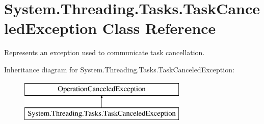 \hypertarget{class_system_1_1_threading_1_1_tasks_1_1_task_canceled_exception}{}\section{System.\+Threading.\+Tasks.\+Task\+Canceled\+Exception Class Reference}
\label{class_system_1_1_threading_1_1_tasks_1_1_task_canceled_exception}


Represents an exception used to communicate task cancellation.  


Inheritance diagram for System.\+Threading.\+Tasks.\+Task\+Canceled\+Exception\+:\begin{figure}[H]
\begin{center}
\leavevmode
\includegraphics[height=2.000000cm]{class_system_1_1_threading_1_1_tasks_1_1_task_canceled_exception}
\end{center}
\end{figure}
